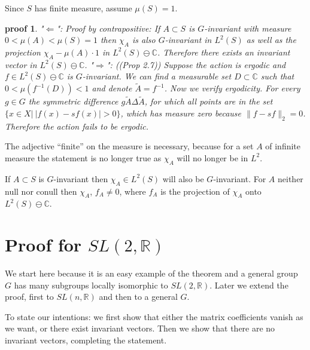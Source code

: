 \documentclass[
  12pt
]{article}
\theoremstyle{break}
\theoremstyle{plain}
\newtheorem*{pf}{proof}
\begin{document}
  Since $S$ has finite measure, assume $\mu(S) =1$.

  \begin{pf}
  "$\Leftarrow$": Proof by contrapositive: If $A\subset S$ is $G$-invariant with
  measure $0 < \mu(A) < \mu(S) = 1$ then $\chi_A$ is also $G$-invariant in
  $L^2(S)$ as well as the projection $\chi_A - \mu(A)\cdot 1$ in $L^2(S)\ominus
  \mathbb{C}$. Therefore there exists an invariant vector in $L^2(S)\ominus
  \mathbb{C}$. "$\Rightarrow$": (\cite{Kerr16}(Prop 2.7)) Suppose the action is
  ergodic and $f\in L^2(S)\ominus \mathbb{C}$ is $G$-invariant. We can find a
  measurable set $D\subset \mathbb{C}$ such that $0<\mu(f^{-1}(D)) < 1$ and
  denote $\widetilde{A} = f^{-1}$. Now we verify ergodicity. For every $g\in G$
  the symmetric difference $g\widetilde{A} \Delta \widetilde{A}$, for which all
  points are in the set $\{x \in X | \ |f(x)-sf(x)| > 0\}$, which has measure
  zero because $\|f- sf\|_2=0$. Therefore the action fails to be ergodic.
  \end{pf}

  The adjective ``finite'' on the measure is necessary, because for a set
  $A$ of infinite measure the statement is no longer true as $\chi_A$
  will no longer be in $L^2$.

  If $A\subset S$ is $G$-invariant then $\chi_A\in L^2(S)$ will also
  be $G$-invariant. 
  For $A$ neither null nor conull then
  $\chi_A$, $f_A \neq 0$, where $f_A$ is the projection of
  $\chi_A$ onto $L^2(S) \ominus \mathbb{C}$.









\hypertarget{proof-for-sln2r}{%
\section{Proof for \texorpdfstring{$SL(2, \mathbb{R})$}{SL(2, R)}}\label{proof-for-sln2r}}


  We start here because it is an easy example of the theorem and a general
  group $G$ has many subgroups locally isomorphic to
  $SL(2, \mathbb{R})$. Later we extend the proof, first to
  $SL(n, \mathbb{R})$ and then to a general $G$.

  To state our intentions: we first show that either the matrix
  coefficients vanish as we want, or there exist invariant vectors. Then
  we show that there are no invariant vectors, completing the statement.
\end{document}
